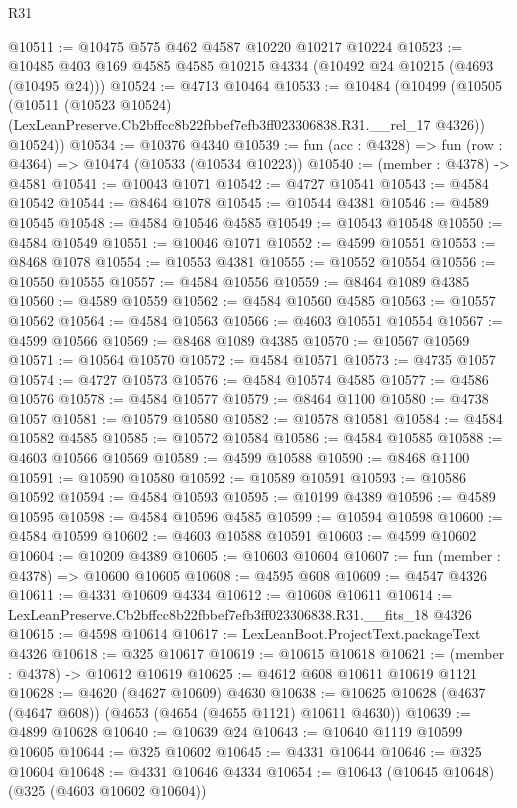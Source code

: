 \begin{lexlean}{R31}
\begin{coremodule}
@10511 := @10475 @575 @462 @4587 @10220 @10217 @10224
@10523 := @10485 @403 @169 @4585 @4585 @10215 @4334 (@10492 @24 @10215 (@4693 (@10495 @24)))
@10524 := @4713 @10464
@10533 := @10484
    (@10499
      (@10505
        (@10511
          (@10523 @10524)
          (LexLeanPreserve.Cb2bffcc8b22fbbef7efb3ff023306838.R31.__rel_17 @4326))
        @10524))
@10534 := @10376 @4340
@10539 := fun (acc : @4328) => fun (row : @4364) => @10474 (@10533 (@10534 @10223))
@10540 := (member : @4378) -> @4581
@10541 := @10043 @1071
@10542 := @4727 @10541
@10543 := @4584 @10542
@10544 := @8464 @1078
@10545 := @10544 @4381
@10546 := @4589 @10545
@10548 := @4584 @10546 @4585
@10549 := @10543 @10548
@10550 := @4584 @10549
@10551 := @10046 @1071
@10552 := @4599 @10551
@10553 := @8468 @1078
@10554 := @10553 @4381
@10555 := @10552 @10554
@10556 := @10550 @10555
@10557 := @4584 @10556
@10559 := @8464 @1089 @4385
@10560 := @4589 @10559
@10562 := @4584 @10560 @4585
@10563 := @10557 @10562
@10564 := @4584 @10563
@10566 := @4603 @10551 @10554
@10567 := @4599 @10566
@10569 := @8468 @1089 @4385
@10570 := @10567 @10569
@10571 := @10564 @10570
@10572 := @4584 @10571
@10573 := @4735 @1057
@10574 := @4727 @10573
@10576 := @4584 @10574 @4585
@10577 := @4586 @10576
@10578 := @4584 @10577
@10579 := @8464 @1100
@10580 := @4738 @1057
@10581 := @10579 @10580
@10582 := @10578 @10581
@10584 := @4584 @10582 @4585
@10585 := @10572 @10584
@10586 := @4584 @10585
@10588 := @4603 @10566 @10569
@10589 := @4599 @10588
@10590 := @8468 @1100
@10591 := @10590 @10580
@10592 := @10589 @10591
@10593 := @10586 @10592
@10594 := @4584 @10593
@10595 := @10199 @4389
@10596 := @4589 @10595
@10598 := @4584 @10596 @4585
@10599 := @10594 @10598
@10600 := @4584 @10599
@10602 := @4603 @10588 @10591
@10603 := @4599 @10602
@10604 := @10209 @4389
@10605 := @10603 @10604
@10607 := fun (member : @4378) => @10600 @10605
@10608 := @4595 @608
@10609 := @4547 @4326
@10611 := @4331 @10609 @4334
@10612 := @10608 @10611
@10614 := LexLeanPreserve.Cb2bffcc8b22fbbef7efb3ff023306838.R31.__fits_18 @4326
@10615 := @4598 @10614
@10617 := LexLeanBoot.ProjectText.packageText @4326
@10618 := @325 @10617
@10619 := @10615 @10618
@10621 := (member : @4378) -> @10612 @10619
@10625 := @4612 @608 @10611 @10619 @1121
@10628 := @4620 (@4627 @10609) @4630
@10638 := @10625 @10628 (@4637 (@4647 @608)) (@4653 (@4654 (@4655 @1121) @10611 @4630))
@10639 := @4899 @10628
@10640 := @10639 @24
@10643 := @10640 @1119 @10599 @10605
@10644 := @325 @10602
@10645 := @4331 @10644
@10646 := @325 @10604
@10648 := @4331 @10646 @4334
@10654 := @10643 (@10645 @10648) (@325 (@4603 @10602 @10604))

\end{coremodule}
\end{lexlean}
